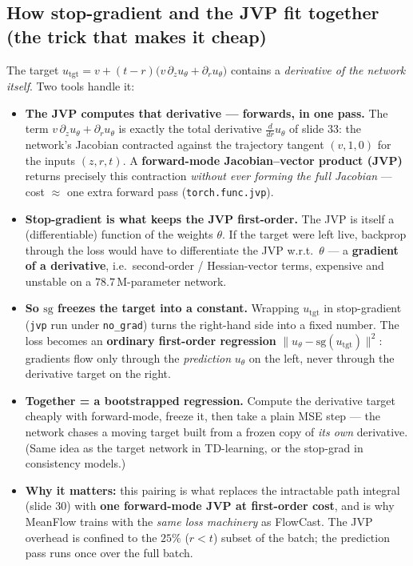 \documentclass[11pt]{article}
\begin{document}
\subsection*{How stop-gradient and the JVP fit together (the trick that makes it cheap)}
\noindent The target $u_{\text{tgt}} = v + (t-r)\bigl(v\,\partial_z u_\theta + \partial_r u_\theta\bigr)$
contains a \emph{derivative of the network itself}. Two tools handle it:
\begin{itemize}
  \item \textbf{The JVP computes that derivative --- forwards, in one pass.}
        The term $v\,\partial_z u_\theta + \partial_r u_\theta$ is exactly the
        total derivative $\frac{d}{dr}u_\theta$ of slide 33: the network's
        Jacobian contracted against the trajectory tangent $(v, 1, 0)$ for the
        inputs $(z, r, t)$. A \textbf{forward-mode Jacobian--vector product
        (JVP)} returns precisely this contraction \emph{without ever forming the
        full Jacobian} --- cost $\approx$ one extra forward pass
        (\texttt{torch.func.jvp}).
  \item \textbf{Stop-gradient is what keeps the JVP first-order.} The JVP is
        itself a (differentiable) function of the weights $\theta$. If the
        target were left live, backprop through the loss would have to
        differentiate the JVP w.r.t.\ $\theta$ --- a \textbf{gradient of a
        derivative}, i.e.\ second-order / Hessian-vector terms, expensive and
        unstable on a $78.7$\,M-parameter network.
  \item \textbf{So $\mathrm{sg}$ freezes the target into a constant.} Wrapping
        $u_{\text{tgt}}$ in stop-gradient (\texttt{jvp} run under
        \texttt{no\_grad}) turns the right-hand side into a fixed number. The
        loss becomes an \textbf{ordinary first-order regression}
        $\|u_\theta - \mathrm{sg}(u_{\text{tgt}})\|^2$: gradients flow only
        through the \emph{prediction} $u_\theta$ on the left, never through the
        derivative target on the right.
  \item \textbf{Together = a bootstrapped regression.} Compute the derivative
        target cheaply with forward-mode, freeze it, then take a plain MSE step
        --- the network chases a moving target built from a frozen copy of
        \emph{its own} derivative. (Same idea as the target network in
        TD-learning, or the stop-grad in consistency models.)
  \item \textbf{Why it matters:} this pairing is what replaces the intractable
        path integral (slide 30) with \textbf{one forward-mode JVP at
        first-order cost}, and is why MeanFlow trains with the \emph{same loss
        machinery} as FlowCast. The JVP overhead is confined to the $25\%$
        ($r < t$) subset of the batch; the prediction pass runs once over the
        full batch.
\end{itemize}
\end{document}
